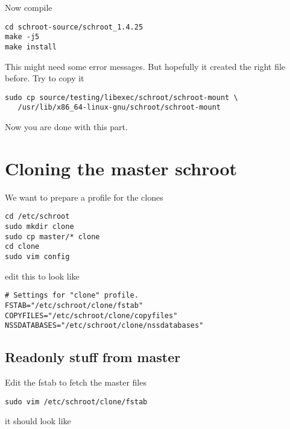 \documentclass[a4paper]{book}
\begin{document}
Now compile

\begin{verbatim}
cd schroot-source/schroot_1.4.25
make -j5
make install
\end{verbatim}

This might need some error messages. But hopefully it created the right file
before. Try to copy it

\begin{verbatim}
sudo cp source/testing/libexec/schroot/schroot-mount \
   /usr/lib/x86_64-linux-gnu/schroot/schroot-mount 
\end{verbatim}

Now you are done with this part.
\section{Cloning the master schroot}

We want to prepare a profile for the clones

\begin{verbatim}
cd /etc/schroot
sudo mkdir clone
sudo cp master/* clone
cd clone
sudo vim config
\end{verbatim}

edit this to look like

\begin{verbatim}
# Settings for "clone" profile.
FSTAB="/etc/schroot/clone/fstab"
COPYFILES="/etc/schroot/clone/copyfiles"
NSSDATABASES="/etc/schroot/clone/nssdatabases"
\end{verbatim}

\subsection{Readonly stuff from master}

Edit the fstab to fetch the master files

\begin{verbatim}
sudo vim /etc/schroot/clone/fstab
\end{verbatim}

it should look like
\end{document}
